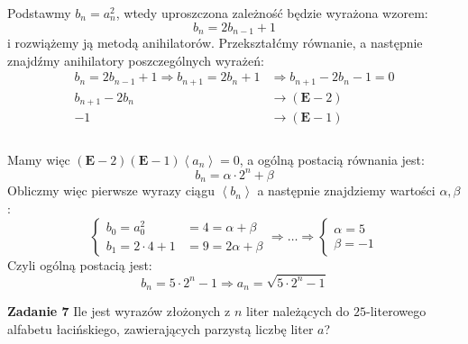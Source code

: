 \documentclass[a4paper,12pt]{article}
\newcommand{\annihilator}{\mathbf{E}}					%
\newcommand{\sequence}[1]{\left\langle #1 \right\rangle} %
\begin{document}
\noindent Podstawmy $b_n = a_n^2$, wtedy uproszczona zależność będzie wyrażona wzorem:
\[ b_n = 2 b_{n-1} + 1 \]
i rozwiążemy ją metodą anihilatorów. Przekształćmy równanie, a następnie znajdźmy anihilatory poszczególnych wyrażeń:
\begin{align*}
	b_n = 2 b_{n-1} + 1  \Longrightarrow  b_{n+1} = 2 b_n + 1 &\Longrightarrow b_{n+1} - 2 b_n - 1 = 0 \\
	b_{n+1} - 2 b_n 	&\longrightarrow (\annihilator - 2) \\
	-1					&\longrightarrow (\annihilator - 1) \\
\end{align*}\\[-30pt]
Mamy więc $(\annihilator - 2)(\annihilator - 1) \sequence{a_n} = 0$, a ogólną postacią równania jest:
\[ b_n = \alpha \cdot 2^n + \beta \]
Obliczmy więc pierwsze wyrazy ciągu $\sequence{b_n}$ a następnie znajdziemy wartości $\alpha, \beta$:
\[
\begin{cases}
	b_0 = a_0^2 		&= 4 = \alpha + \beta \\
	b_1 = 2\cdot 4 + 1 	&= 9 = 2\alpha + \beta
\end{cases}	
\Rightarrow \ldots \Rightarrow
\begin{cases}
	\alpha = 5 \\
	\beta = -1
\end{cases}
\]
Czyli ogólną postacią jest:
\[ b_n = 5 \cdot 2^n - 1 \Longrightarrow a_n = \sqrt{5 \cdot 2^n - 1} \]


\noindent \newline \textbf{Zadanie 7} \newline
Ile jest wyrazów złożonych z $n$ liter należących do $25$-literowego alfabetu łacińskiego, zawierających parzystą liczbę liter $a$? \\
\end{document}
